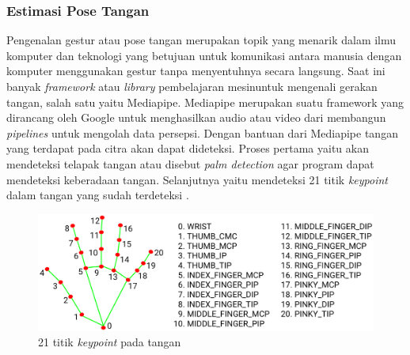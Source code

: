 \subsubsection{Estimasi Pose Tangan}
Pengenalan gestur atau pose tangan merupakan topik yang menarik dalam ilmu komputer dan teknologi yang betujuan untuk komunikasi antara manusia dengan komputer menggunakan gestur tanpa menyentuhnya secara langsung. Saat ini banyak \textit{framework} atau \textit{library} pembelajaran mesinuntuk mengenali gerakan tangan, salah satu yaitu Mediapipe. Mediapipe merupakan suatu framework yang dirancang oleh Google untuk menghasilkan audio atau video dari membangun \textit{pipelines} untuk mengolah data persepsi. Dengan bantuan dari Mediapipe tangan yang terdapat pada citra akan dapat dideteksi. Proses pertama yaitu akan mendeteksi telapak tangan atau disebut \textit{palm detection} agar program dapat mendeteksi keberadaan tangan. Selanjutnya yaitu mendeteksi 21 titik \textit{keypoint} dalam tangan yang sudah terdeteksi \parencite{UniversitasDinamika}. 

\begin{figure}[!h]
  \centering
	\includegraphics[width=1\linewidth]{gambar/hand_landmarks.png}
	\caption{21 titik \textit{keypoint} pada tangan \parencite{mediapipe}}
	\label{fig:tangan}
\end{figure}


